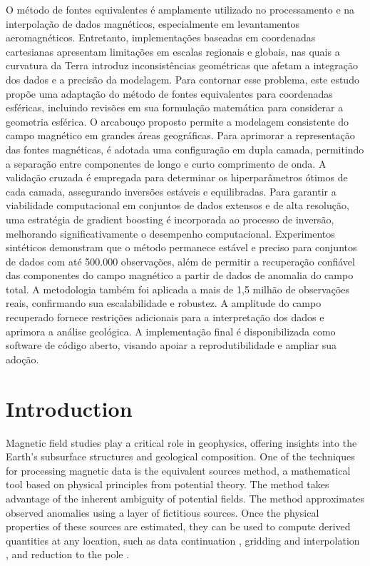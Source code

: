 \documentclass[a4paper,oneside,10pt]{book}
\begin{document}
O método de fontes equivalentes é amplamente utilizado no processamento e
na interpolação de dados magnéticos, especialmente em levantamentos
aeromagnéticos. Entretanto, implementações baseadas em coordenadas
cartesianas apresentam limitações em escalas regionais e globais, nas
quais a curvatura da Terra introduz inconsistências geométricas que
afetam a integração dos dados e a precisão da modelagem. Para contornar
esse problema, este estudo propõe uma adaptação do método de fontes
equivalentes para coordenadas esféricas, incluindo revisões em sua
formulação matemática para considerar a geometria esférica. O arcabouço
proposto permite a modelagem consistente do campo magnético em grandes
áreas geográficas.
Para aprimorar a representação das fontes magnéticas, é adotada uma
configuração em dupla camada, permitindo a separação entre componentes
de longo e curto comprimento de onda. A validação cruzada é empregada
para determinar os hiperparâmetros ótimos de cada camada, assegurando
inversões estáveis e equilibradas. Para garantir a viabilidade
computacional em conjuntos de dados extensos e de alta resolução, uma
estratégia de gradient boosting é incorporada ao processo de inversão,
melhorando significativamente o desempenho computacional.
Experimentos sintéticos demonstram que o método permanece estável e
preciso para conjuntos de dados com até 500.000 observações, além de
permitir a recuperação confiável das componentes do campo magnético a
partir de dados de anomalia do campo total. A metodologia também foi
aplicada a mais de 1,5 milhão de observações reais, confirmando sua
escalabilidade e robustez. A amplitude do campo recuperado fornece
restrições adicionais para a interpretação dos dados e aprimora a
análise geológica.
A implementação final é disponibilizada como software de código aberto,
visando apoiar a reprodutibilidade e ampliar sua adoção.




\listoffigures
\listofalgorithms
\tableofcontents

\mainmatter
\pagestyle{fancy}


\chapter{Introduction}

Magnetic field studies play a critical role in geophysics, offering insights
into the Earth's subsurface structures and geological composition.
One of the techniques for processing magnetic data is the equivalent
sources method, a mathematical tool based on physical principles from potential
theory.
The method takes advantage of the inherent ambiguity of potential fields.
The method approximates observed anomalies using a layer of fictitious sources.
Once the physical properties of these sources are estimated, they can be used
to compute derived quantities at any location, such as data continuation
\citep{Emilia1973, ZhiWen2022, Li2023}, gridding and interpolation
\citep{Mendonca1994, Mendonca1995, Dampney1969, Li2006, Cordell1992}, and
reduction to the pole \citep{Guspi2009, Li2001, Silva1986}.
\end{document}
